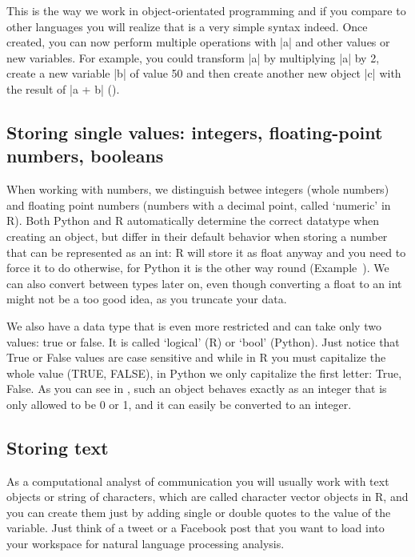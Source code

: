 This is the way we work in object-orientated programming and if you
compare to other languages you will realize that is a very simple
syntax indeed. Once created, you can now perform multiple operations
with |a| and other values or new variables. For example, you
could transform |a| by multiplying |a| by 2, create a new
variable |b| of value 50 and then create another new object
|c| with the result of |a + b| ().





\subsection{Storing single values: integers, floating-point numbers, booleans}

When working with numbers, we distinguish betwee integers (whole
numbers) and floating point numbers (numbers with a decimal point,
called `numeric' in R). Both Python and R automatically determine the
correct datatype when creating an object, but differ in their default
behavior when storing a number that can be represented as an int: R
will store it as float anyway and you need to force it to do
otherwise, for Python it is the other way round
(Example~). We can also convert between types later on,
even though converting a float to an int might not be a too good idea,
as you truncate your data.

We also have a data type that is even more restricted and can take
only two values: true or false. It is called `logical' (R) or `bool'
(Python).  Just notice that True or False values are case sensitive
and while in R you must capitalize the whole value (TRUE, FALSE), in
Python we only capitalize the first letter: True, False.  As you can
see in , such an object behaves exactly as an integer that
is only allowed to be 0 or 1, and it can easily be converted to an
integer.





\subsection{Storing text}

As a computational analyst of communication you will usually work with text objects or string of characters, which are called character vector objects in R, and you can create them just by adding single or double quotes to the value of the variable. Just think of a tweet or a Facebook post that you want to load into your workspace for natural language processing analysis.

